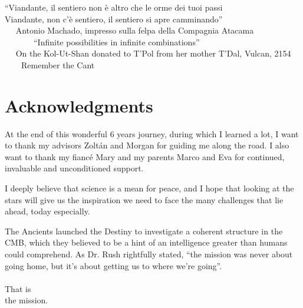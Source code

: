 
\begin{flushright}
``Viandante, il sentiero non \`e altro che le orme dei tuoi passi \\
 Viandante, non c'\`e sentiero, il sentiero si apre camminando''\\ \,\,\,\,\,\,
\scriptsize
Antonio Machado, impresso sulla felpa della Compagnia Atacama \\ \,\,\,\,\,\,\,\,\,\,\,\,\,\,\,\,\,\,\,
\normalsize
``Infinite possibilities in infinite combinations'' \\ \,\,\,\,\,\,
\scriptsize
On the Kol-Ut-Shan donated to T'Pol from her mother T'Dal, Vulcan, 2154
\normalsize \\ \,\,\,\,\,\,\,\,\,\,
Remember the Cant
\end{flushright}

\section*{Acknowledgments}
\lhead[\fancyplain{}{\thepage}]{\fancyplain{}{\rightmark}}
 \thispagestyle{plain}


	At the end of this wonderful 6 years journey, during which I learned a lot, I want to thank my advisors Zolt\'{a}n and Morgan for guiding me along the road. I also want to thank my fianc\'e Mary and my parents Marco and Eva for continued, invaluable and unconditioned support. 

	I deeply believe that science is a mean for peace, and I hope that looking at the stars will give us the inspiration we need to face the many challenges that lie ahead, today especially. 

	The Ancients launched the Destiny to investigate a coherent structure in the CMB, which they believed to be a hint of an intelligence greater than humans could comprehend. As Dr. Rush rightfully stated, ``the mission was never about going home, but it's about getting us to where we're going''. \\ \\
	That is \\
	the mission.


\clearpage


\thispagestyle{plain}
\par{}
\clearpage

